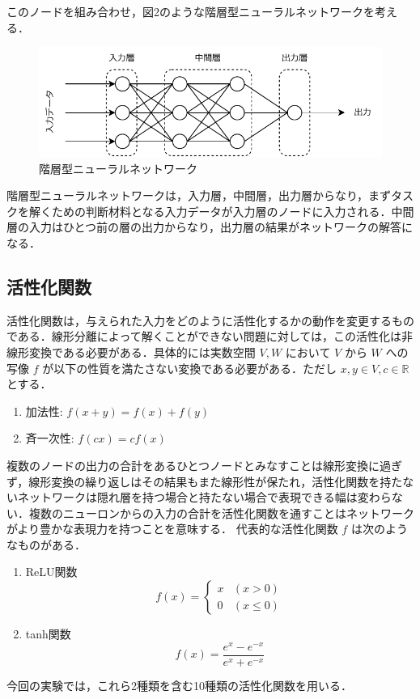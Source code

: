 このノードを組み合わせ，図2のような階層型ニューラルネットワークを考える．

\begin{figure}[h]
    \begin{center}
        \includegraphics[scale=0.8]{img/forwardprop.pdf}
        \caption{階層型ニューラルネットワーク}
    \end{center}
\end{figure}

階層型ニューラルネットワークは，入力層，中間層，出力層からなり，まずタスクを解くための判断材料となる入力データが入力層のノードに入力される．中間層の入力はひとつ前の層の出力からなり，出力層の結果がネットワークの解答になる．\\

\subsection{活性化関数}
活性化関数は，与えられた入力をどのように活性化するかの動作を変更するものである．線形分離によって解くことができない問題に対しては，この活性化は非線形変換である必要がある\cite{活性化関数}．具体的には実数空間 $ V, W $ において  $ V $ から $ W $ への写像 $ f $ が以下の性質を満たさない変換である必要がある．ただし $ x, y \in V, c \in \mathbb{R} $ とする．

\begin{enumerate}
    \item 加法性: $ f(x + y) = f(x) + f(y) $ 
    \item 斉一次性: $ f(cx) = cf(x) $
\end{enumerate}

複数のノードの出力の合計をあるひとつノードとみなすことは線形変換に過ぎず，線形変換の繰り返しはその結果もまた線形性が保たれ，活性化関数を持たないネットワークは隠れ層を持つ場合と持たない場合で表現できる幅は変わらない．複数のニューロンからの入力の合計を活性化関数を通すことはネットワークがより豊かな表現力を持つことを意味する．
代表的な活性化関数 $ f $ は次のようなものがある．

\begin{enumerate}
    \item ReLU関数
    \begin{equation}
        f(x) = 
        \begin{cases}
        x & (x > 0)\\
        0 & (x \leq 0)
        \end{cases}
    \end{equation}

    \item tanh関数
    \begin{equation}
        f(x) = \frac{e^{x} - e^{-x}}{e^{x} + e^{-x}}
    \end{equation}
\end{enumerate}

今回の実験では，これら2種類を含む10種類の活性化関数を用いる．